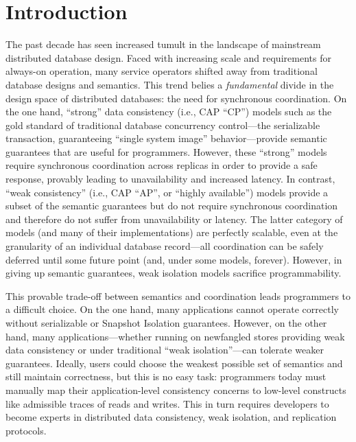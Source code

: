 
\section{Introduction}
\label{sec:intro}

The past decade has seen increased tumult in the landscape of
mainstream distributed database design.  Faced with increasing scale
and requirements for always-on operation, many service operators
shifted away from traditional database designs and semantics. This
trend belies a \textit{fundamental} divide in the design space of
distributed databases: the need for synchronous coordination. On the
one hand, ``strong'' data consistency (i.e., CAP ``CP'') models such
as the gold standard of traditional database concurrency control---the
serializable transaction, guaranteeing ``single system image''
behavior---provide semantic guarantees that are useful for
programmers. However, these ``strong'' models require synchronous
coordination across replicas in order to provide a safe response,
provably leading to unavailability and increased latency. In contrast,
``weak consistency'' (i.e., CAP ``AP'', or ``highly available'')
models provide a subset of the semantic guarantees but do not require
synchronous coordination and therefore do not suffer from
unavailability or latency. The latter category of models (and many of
their implementations) are perfectly scalable, even at the granularity
of an individual database record---all coordination can be safely
deferred until some future point (and, under some models,
forever). However, in giving up semantic guarantees, weak isolation
models sacrifice programmability.

This provable trade-off between semantics and coordination leads
programmers to a difficult choice. On the one hand, many applications
cannot operate correctly without serializable or Snapshot Isolation
guarantees. However, on the other hand, many applications---whether
running on newfangled stores providing weak data consistency or under
traditional ``weak isolation''---can tolerate weaker
guarantees. Ideally, users could choose the weakest possible set of
semantics and still maintain correctness, but this is no easy task:
programmers today must manually map their application-level
consistency concerns to low-level constructs like admissible traces of
reads and writes. This in turn requires developers to become experts
in distributed data consistency, weak isolation, and replication
protocols.


